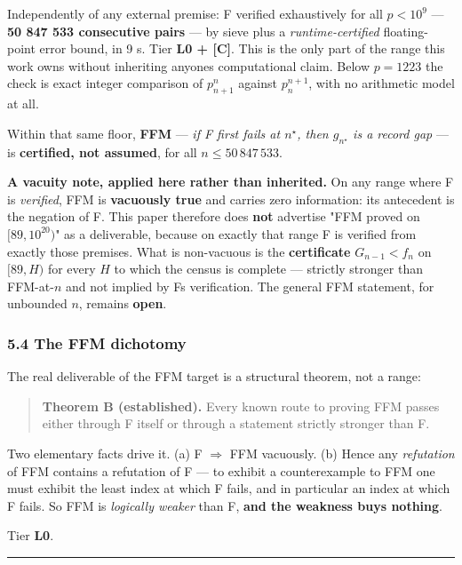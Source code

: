 \documentclass[
  a4paper,
  11pt]{article}
\begin{document}
Independently of any external premise: F verified exhaustively for all
\(p < 10^9\) --- \textbf{50 847 533 consecutive pairs} --- by sieve plus
a \emph{runtime-certified} floating-point error bound, in 9 s. Tier
\textbf{L0 + {[}C{]}}. This is the only part of the range this work owns
without inheriting anyone\textquotesingle s computational claim. Below
\(p = 1223\) the check is exact integer comparison of \(p_{n+1}^n\)
against \(p_n^{n+1}\), with no arithmetic model at all.

Within that same floor, \textbf{FFM} --- \emph{if F first fails at
\(n^\star\), then \(g_{n^\star}\) is a record gap} --- is
\textbf{certified, not assumed}, for all \(n \le 50\,847\,533\).

\textbf{A vacuity note, applied here rather than inherited.} On any
range where F is \emph{verified}, FFM is \textbf{vacuously true} and
carries zero information: its antecedent is the negation of F. This
paper therefore does \textbf{not} advertise "FFM proved on
\([89, 10^{20})\)" as a deliverable, because on exactly that range F is
verified from exactly those premises. What is non-vacuous is the
\textbf{certificate} \(G_{n-1} < f_n\) on \([89, H)\) for every \(H\) to
which the census is complete --- strictly stronger than FFM-at-\(n\) and
not implied by F\textquotesingle s verification. The general FFM
statement, for unbounded \(n\), remains \textbf{open}.

\subsubsection{5.4 The FFM dichotomy}\label{54-the-ffm-dichotomy}

The real deliverable of the FFM target is a structural theorem, not a
range:

\begin{quote}
\textbf{Theorem B (established).} Every known route to proving FFM
passes either through F itself or through a statement strictly stronger
than F.
\end{quote}

Two elementary facts drive it. (a) F \(\Rightarrow\) FFM vacuously. (b)
Hence any \emph{refutation} of FFM contains a refutation of F --- to
exhibit a counterexample to FFM one must exhibit the least index at
which F fails, and in particular an index at which F fails. So FFM is
\emph{logically weaker} than F, \textbf{and the weakness buys nothing}.

Tier \textbf{L0}.

\begin{center}\rule{0.5\linewidth}{0.5pt}\end{center}
\end{document}
